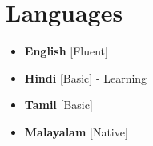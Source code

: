 \documentclass[11pt,a4paper,sans]{moderncv}
\makeatletter
\newcommand*{\customcvproject}[4][.25em]{
	\begin{tabular}{@{}l}
	{\bfseries #2}
	\end{tabular}
	\hfill
	\begin{tabular}{l@{}}
	{\itshape #3}
	\end{tabular}
	\ifx&#4&
	\else{\\
	\begin{minipage}{\maincolumnwidth}
	\small#4
	\end{minipage}}\fi
	\par\addvspace{#1}
}
\makeatother
\begin{document}




\section{Languages}
\begin{multicols}{2}
	\begin{itemize}[label=\textbullet]
		\item \textbf{English} [Fluent]
		\item {\textbf{Hindi} [Basic] - Learning}
		\item {\textbf{Tamil} [Basic]}
		\item {\textbf{Malayalam} [Native]}
	\end{itemize}
\end{multicols}
\end{document}
